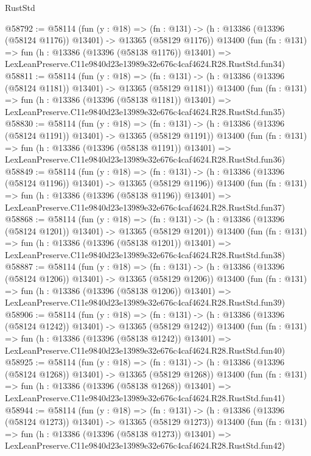 \begin{lexlean}{RustStd}
\begin{coremodule}
@58792 := @58114
    (fun (y : @18) =>
    (fn : @131) -> (h : @13386 (@13396 (@58124 @1176)) @13401) -> @13365 (@58129 @1176))
    @13400
    (fun (fn : @131) =>
    fun (h : @13386 (@13396 (@58138 @1176)) @13401) =>
    LexLeanPreserve.C11e9840d23e13989e32e676c4caf4624.R28.RustStd.fun34)
@58811 := @58114
    (fun (y : @18) =>
    (fn : @131) -> (h : @13386 (@13396 (@58124 @1181)) @13401) -> @13365 (@58129 @1181))
    @13400
    (fun (fn : @131) =>
    fun (h : @13386 (@13396 (@58138 @1181)) @13401) =>
    LexLeanPreserve.C11e9840d23e13989e32e676c4caf4624.R28.RustStd.fun35)
@58830 := @58114
    (fun (y : @18) =>
    (fn : @131) -> (h : @13386 (@13396 (@58124 @1191)) @13401) -> @13365 (@58129 @1191))
    @13400
    (fun (fn : @131) =>
    fun (h : @13386 (@13396 (@58138 @1191)) @13401) =>
    LexLeanPreserve.C11e9840d23e13989e32e676c4caf4624.R28.RustStd.fun36)
@58849 := @58114
    (fun (y : @18) =>
    (fn : @131) -> (h : @13386 (@13396 (@58124 @1196)) @13401) -> @13365 (@58129 @1196))
    @13400
    (fun (fn : @131) =>
    fun (h : @13386 (@13396 (@58138 @1196)) @13401) =>
    LexLeanPreserve.C11e9840d23e13989e32e676c4caf4624.R28.RustStd.fun37)
@58868 := @58114
    (fun (y : @18) =>
    (fn : @131) -> (h : @13386 (@13396 (@58124 @1201)) @13401) -> @13365 (@58129 @1201))
    @13400
    (fun (fn : @131) =>
    fun (h : @13386 (@13396 (@58138 @1201)) @13401) =>
    LexLeanPreserve.C11e9840d23e13989e32e676c4caf4624.R28.RustStd.fun38)
@58887 := @58114
    (fun (y : @18) =>
    (fn : @131) -> (h : @13386 (@13396 (@58124 @1206)) @13401) -> @13365 (@58129 @1206))
    @13400
    (fun (fn : @131) =>
    fun (h : @13386 (@13396 (@58138 @1206)) @13401) =>
    LexLeanPreserve.C11e9840d23e13989e32e676c4caf4624.R28.RustStd.fun39)
@58906 := @58114
    (fun (y : @18) =>
    (fn : @131) -> (h : @13386 (@13396 (@58124 @1242)) @13401) -> @13365 (@58129 @1242))
    @13400
    (fun (fn : @131) =>
    fun (h : @13386 (@13396 (@58138 @1242)) @13401) =>
    LexLeanPreserve.C11e9840d23e13989e32e676c4caf4624.R28.RustStd.fun40)
@58925 := @58114
    (fun (y : @18) =>
    (fn : @131) -> (h : @13386 (@13396 (@58124 @1268)) @13401) -> @13365 (@58129 @1268))
    @13400
    (fun (fn : @131) =>
    fun (h : @13386 (@13396 (@58138 @1268)) @13401) =>
    LexLeanPreserve.C11e9840d23e13989e32e676c4caf4624.R28.RustStd.fun41)
@58944 := @58114
    (fun (y : @18) =>
    (fn : @131) -> (h : @13386 (@13396 (@58124 @1273)) @13401) -> @13365 (@58129 @1273))
    @13400
    (fun (fn : @131) =>
    fun (h : @13386 (@13396 (@58138 @1273)) @13401) =>
    LexLeanPreserve.C11e9840d23e13989e32e676c4caf4624.R28.RustStd.fun42)

\end{coremodule}
\end{lexlean}
